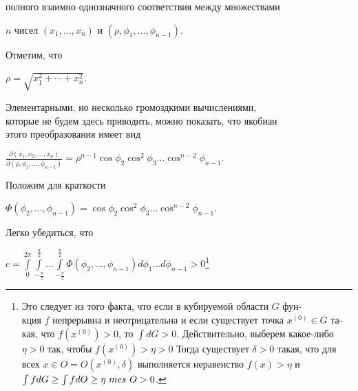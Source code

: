 ﻿\documentclass[twocolumn]{article}
\begin{document}
\makeatletter
\renewcommand{\@oddhead}{\textrm{\footnotesize\bf{154}}{\footnotesize\slshape{\hspace{115pt}\S\ 48. \it Несобственные кратные интегралы}}\hfil\textrm{\footnotesize\slshape{\hspace{10pt} 48.3. \it Несобственные интегралы функций, меняющих знак \hspace{60pt}}}{\footnotesize\bf{155 \hspace{40pt}}}}
\makeatother

{\raggedright полного взаимно однозначного соответствия между множествами

$n$ чисел $(x_1,\ldots,x_n)$ и $(\rho,\phi_1,\ldots,\phi_{n-1})$.
}

{\raggedright Отметим, что}
\begin{center}
$\rho = \sqrt{x_1^2+\cdots+x_n^2}$.
\end{center}
\hspace{5pt} Элементарными, но несколько громоздкими вычислениями,\\ которые не будем здесь приводить, можно показать, что якобиан\\ этого преобразования имеет вид
\begin{center}
$\frac{\partial(x_1,x_2,\ldots,x_n)}{\partial(\rho,\phi_1,\ldots,\phi_{n-1})} = \rho^{n-1}\cos{\phi_2}\cos^2{\phi_3}\ldots\cos^{n-2}{\phi_{n-1}}$.
\end{center}
\hspace{5pt} Положим для краткости
\begin{center}
$\Phi(\phi_2,\ldots,\phi_{n-1}) = \cos{\phi_2}\cos^2{\phi_3\ldots\cos^{n-2}{\phi_{n-1}}}$.
\end{center}
\hspace{5pt} Легко убедиться, что
\begin{center}
$c = \int\limits_0^{2\pi} \int\limits_{-\frac{\pi}{2}}^{\frac{\pi}{2}}\ldots\int\limits_{-\frac{\pi}{2}}^{\frac{\pi}{2}} \Phi(\phi_2,\ldots,\phi_{n-1})d\phi_1\ldots d\phi_{n-1} > 0$\renewcommand{\thefootnote}{*)}\footnote{%
Это следует из того факта, что если в кубируемой области $G$ фун-\\кция $f$ непрерывна и неотрицательна и если существует точка $x^{(0)}\in G$ та-\\кая, что $f(x^{(0)}) > 0$, то $\int dG > 0$. Действительно, выберем какое-либо\\ $\eta > 0$ так, чтобы $f(x^{(0)}) > \eta > 0$  Тогда существует $\delta > 0$ такая, что для\\ всех $x \in O = O(x^{(0)}, \delta)$ выполняется неравенство $f(x) > \eta$ и $\int fdG \geq \int fdO \\ \geq \eta\ mes\ O > 0$.}
\end{center}
\end{document}
